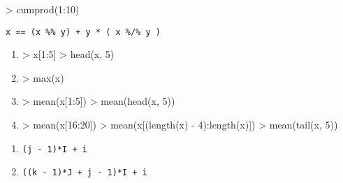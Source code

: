 \begin{reponse}{3.4}
\begin{Schunk}
\begin{Sinput}
> cumprod(1:10)
\end{Sinput}
\end{Schunk}
  
\end{reponse}
\begin{reponse}{3.5}
    \verb|x == (x %% y) + y * ( x %/% y )|
  
\end{reponse}
\begin{reponse}{3.6}
    \begin{enumerate}
\item
\begin{Schunk}
\begin{Sinput}
> x[1:5]
> head(x, 5)
\end{Sinput}
\end{Schunk}
\item
\begin{Schunk}
\begin{Sinput}
> max(x)
\end{Sinput}
\end{Schunk}
\item
\begin{Schunk}
\begin{Sinput}
> mean(x[1:5])
> mean(head(x, 5))
\end{Sinput}
\end{Schunk}
\item
\begin{Schunk}
\begin{Sinput}
> mean(x[16:20])
> mean(x[(length(x) - 4):length(x)])
> mean(tail(x, 5))
\end{Sinput}
\end{Schunk}
    \end{enumerate}
  
\end{reponse}
\begin{reponse}{3.7}
    \begin{enumerate}
    \item \verb|(j - 1)*I + i|
    \item \verb|((k - 1)*J + j - 1)*I + i|
    \end{enumerate}
  
\end{reponse}
